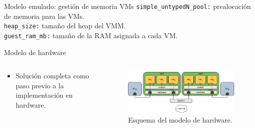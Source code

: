 \documentclass[serif, aspectratio=169]{beamer}
\begin{document}
\begin{frame}{Modelo emulado: gestión de memoria VMs}
    \texttt{simple\_untypedN\_pool:} prealocación de memoria para las VMs. \\
    \texttt{heap\_size:} tamaño del heap del VMM. \\
    \texttt{guest\_ram\_mb:} tamaño de la RAM asignada a cada VM.
\end{frame}

\begin{frame}{Modelo de hardware}
    \begin{columns}
        \begin{column}{0.4\textwidth}
            \begin{itemize}
                \item Solución completa como paso previo a la implementación en hardware.
        
            \end{itemize}
        \end{column}
        \begin{column}{0.6\textwidth}
            \begin{figure}
                \centering
                \includegraphics[width=\textwidth]{../../Tesis/figs/3_model4.png}
                \caption{Esquema del modelo de hardware.}
            \end{figure}
        \end{column}
    \end{columns}
\end{frame}
\end{document}
